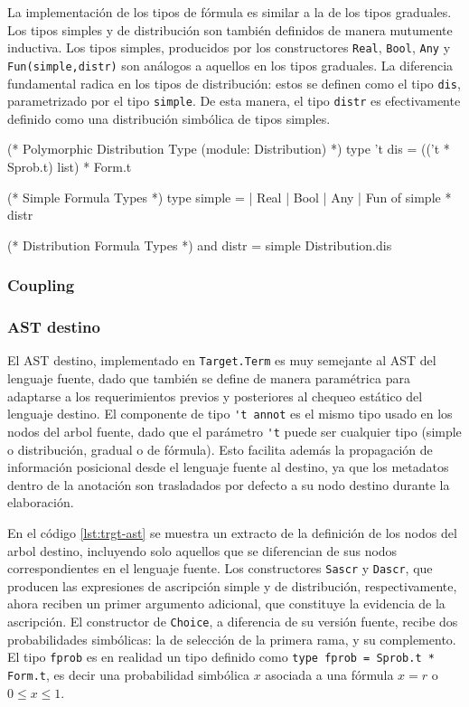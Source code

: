 La implementación de los tipos de fórmula es similar a la de los tipos
graduales. Los tipos simples y de distribución son también definidos de manera
mutumente inductiva. Los tipos simples, producidos por los constructores
\verb|Real|, \verb|Bool|, \verb|Any| y \verb|Fun(simple,distr)| son análogos a
aquellos en los tipos graduales. La diferencia fundamental radica en los tipos de
distribución: estos se definen como el tipo \verb|dis|, parametrizado por el
tipo \verb|simple|. De esta manera, el tipo \verb|distr| es efectivamente
definido como una distribución simbólica de tipos simples. 

\begin{ocamlblock}[caption={Distribución Paramétrica y Tipos de Fórmula}, label={lst:ftype}]
  (* Polymorphic Distribution Type (module: Distribution) *)
  type 't dis = (('t * Sprob.t) list) * Form.t

  (* Simple Formula Types *)
  type simple = 
  | Real
  | Bool
  | Any 
  | Fun of simple * distr

  (* Distribution Formula Types *)
  and distr = simple Distribution.dis
\end{ocamlblock}



\subsubsection{Coupling}

\TODO{}



\subsubsection{AST destino}
El AST destino, implementado en \verb|Target.Term| es muy semejante al AST del
lenguaje fuente, dado que también se define de manera paramétrica para
adaptarse a los requerimientos previos y posteriores al chequeo estático del
lenguaje destino. El componente de tipo \verb|'t annot| es el mismo tipo usado
en los nodos del arbol fuente, dado que el parámetro \verb|'t| puede ser
cualquier tipo (simple o distribución, gradual o de fórmula). Esto facilita
además la propagación de información posicional desde el lenguaje fuente al
destino, ya que los metadatos dentro de la anotación son trasladados por defecto
a su nodo destino durante la elaboración.

En el código \ref{lst:trgt-ast} se muestra un extracto de la
definición de los nodos del arbol destino, incluyendo solo aquellos
que se diferencian de sus nodos correspondientes en el lenguaje
fuente.  Los constructores \verb|Sascr| y \verb|Dascr|, que producen
las expresiones de ascripción simple y de distribución,
respectivamente, ahora reciben un primer argumento adicional, que
constituye la evidencia de la ascripción. El constructor de
\verb|Choice|, a diferencia de su versión fuente, recibe dos
probabilidades simbólicas: la de selección de la primera rama, y su
complemento. El tipo \verb|fprob| es en realidad un tipo definido
como \verb|type fprob = Sprob.t * Form.t|, es decir una probabilidad
simbólica $x$ asociada a una fórmula $x=r$ o $0\leq x \leq 1$.


